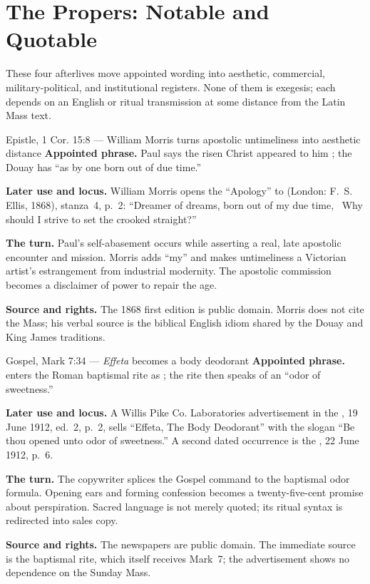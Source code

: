 \sectionguard
\section*{The Propers: Notable and Quotable}

These four afterlives move appointed wording into aesthetic, commercial,
military-political, and institutional registers. None of them is exegesis;
each depends on an English or ritual transmission at some distance from the
Latin Mass text.

\begin{afterlife}{Epistle, 1 Cor. 15:8 --- William Morris turns apostolic untimeliness into aesthetic distance}
\textbf{Appointed phrase.} Paul says the risen Christ appeared to him
; the Douay has ``as by one born out of due time.''

\textbf{Later use and locus.} William Morris opens the ``Apology'' to
 (London: F.~S. Ellis, 1868), stanza~4, p.~2:
``Dreamer of dreams, born out of my due time, \textbar\ Why should I strive
to set the crooked straight?''

\textbf{The turn.} Paul's self-abasement occurs while asserting a real, late
apostolic encounter and mission. Morris adds ``my'' and makes untimeliness a
Victorian artist's estrangement from industrial modernity. The apostolic
commission becomes a disclaimer of power to repair the age.

\textbf{Source and rights.} The 1868 first edition is public domain. Morris does not cite
the Mass; his verbal source is the biblical English idiom shared by the Douay
and King James traditions.
\end{afterlife}

\begin{afterlife}{Gospel, Mark 7:34 --- \emph{Effeta} becomes a body deodorant}
\textbf{Appointed phrase.}  enters the
Roman baptismal rite as ; the rite then speaks of an ``odor of
sweetness.''

\textbf{Later use and locus.} A Willis Pike Co. Laboratories advertisement in
the , 19 June 1912, ed.~2, p.~2, sells
``Effeta, The Body Deodorant'' with the slogan ``Be thou opened unto odor of
sweetness.'' A second dated occurrence is the ,
22 June 1912, p.~6.

\textbf{The turn.} The copywriter splices the Gospel command to the baptismal
odor formula. Opening ears and forming confession becomes a twenty-five-cent
promise about perspiration. Sacred language is not merely quoted; its ritual
syntax is redirected into sales copy.

\textbf{Source and rights.} The newspapers are public domain. The immediate source is the
baptismal rite, which itself receives Mark~7; the advertisement shows no
dependence on the Sunday Mass.
\end{afterlife}

